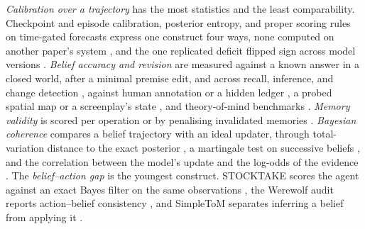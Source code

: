 \emph{Calibration over a trajectory} has the most statistics and the least comparability. Checkpoint and episode calibration, posterior entropy, and proper scoring rules on time-gated forecasts express one construct four ways, none computed on another paper's system \citep{lin2026uncertainty,singh2026agent,chattopadhayay2026belief,dixon2026belief,ghosh2026finbench,ye2026forecast}, and the one replicated deficit flipped sign across model versions \citep{joshi2026replication}. \emph{Belief accuracy and revision} are measured against a known answer in a closed world, after a minimal premise edit, and across recall, inference, and change detection \citep{xu2026should,dhanda2026deltalogic,nguyen2026dynamic}, against human annotation or a hidden ledger \citep{myakala2026beliefshift,chao2026stale,hao2026memops,yang2026groupmembench,srivastava2026constructing}, a probed spatial map or a screenplay's state \citep{zhang2026theory,tian2026stage}, and theory-of-mind benchmarks \citep{kim2023fantom,bawatneh2026omnitom,wang2026mindgames}. \emph{Memory validity} is scored per operation or by penalising invalidated memories \citep{chen2025halumem,wu2024longmemeval,liu2026worldmemarena,uddin2026recall}. \emph{Bayesian coherence} compares a belief trajectory with an ideal updater, through total-variation distance to the exact posterior \citep{samanta2026bayesbench}, a martingale test on successive beliefs \citep{he2025martingale}, and the correlation between the model's update and the log-odds of the evidence \citep{imran2025are,yuan2025do}. The \emph{belief--action gap} is the youngest construct. STOCKTAKE scores the agent against an exact Bayes filter on the same observations \citep{deb2026stocktake}, the Werewolf audit reports action--belief consistency \citep{gao2026auditing}, and SimpleToM separates inferring a belief from applying it \citep{gu2024simpletom}.
